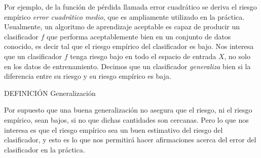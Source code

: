 \documentclass{article}
\begin{document}
Por ejemplo, de la función de pérdida llamada error cuadrático se deriva el riesgo empírico \textit{error cuadrático medio}, que es ampliamente
utilizado en la práctica. Usualmente, un algoritmo de aprendizaje aceptable es capaz de producir un clasificador $f$ que performa aceptablemente bien en un conjunto de datos
conocido, es decir tal que el riesgo empírico del clasificador es bajo. Nos interesa que un clasificador $f$ tenga riesgo bajo en todo el espacio
de entrada $X$, no solo en los datos de entrenamiento. Decimos que un clasificador \textit{generaliza} bien si la diferencia entre su riesgo
y su riesgo empírico es baja.\newline

DEFINICIÓN Generalización\newline

Por supuesto que una buena generalización no asegura que el riesgo, ni el riesgo empírico, sean bajos, si no que dichas cantidades son cercanas.
Pero lo que nos interesa es que el riesgo empírico sea un buen estimativo del riesgo del clasificador, y esto es lo que nos permitirá
hacer afirmaciones acerca del error del clasificador en la práctica.
\end{document}
